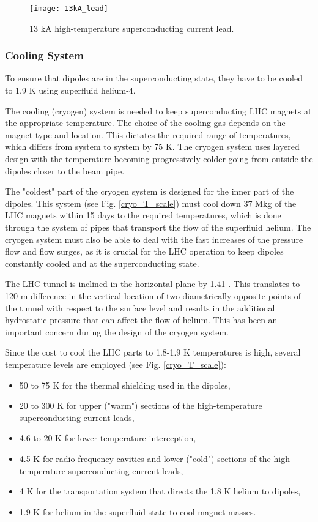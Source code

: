 \begin{normalsize}
\begin{figure}[H]
  \centering
  \texttt{[image: 13kA\_lead]}
  \caption{13 kA high-temperature superconducting current lead.}\label{13kA_lead}
\end{figure}



\subsubsection{Cooling System}\label{sec:cryogenic}

To ensure that dipoles are in the superconducting state, they have to be cooled to 1.9 K using superfluid helium-4. 

The cooling (cryogen) system is needed to keep superconducting LHC magnets at the appropriate temperature. The choice of the cooling gas depends on the magnet type and location. This dictates the required range of temperatures, which differs from system to system by 75 K. The cryogen system uses layered design with the temperature becoming progressively colder going from outside the dipoles closer to the beam pipe. 

The "coldest" part of the cryogen system is designed for the inner part of the dipoles. This system (see Fig. \ref{cryo_T_scale}) must cool down 37 Mkg of the LHC magnets within 15 days to the required temperatures, which is done through the system of pipes that transport the flow of the superfluid helium. The cryogen system must also be able to deal with the fast increases of the pressure flow and flow surges, as it is crucial for the LHC operation to keep dipoles constantly cooled and at the superconducting state.


The LHC tunnel is inclined in the horizontal plane by 1.41$^\circ$. This translates to 120 m difference in the vertical location of two diametrically opposite points of the tunnel with respect to the surface level and results in the additional hydrostatic pressure that can affect the flow of helium. This has been an important concern during the design of the cryogen system.


Since the cost to cool the LHC parts to 1.8-1.9 K temperatures is high, several temperature levels are employed (see Fig. \ref{cryo_T_scale}):
 
\begin{itemize}
\item 50 to 75 K for the thermal shielding used in the dipoles,
\item 20 to 300 K for upper ("warm") sections of the high-temperature superconducting current leads,
\item 4.6 to 20 K for lower temperature interception,
\item 4.5 K for radio frequency cavities and lower ("cold") sections of the high-temperature superconducting current leads,
\item 4 K for the transportation system that directs the 1.8 K helium to dipoles,
\item 1.9 K for helium in the superfluid state to cool magnet masses.
\end{itemize}


\end{normalsize}
